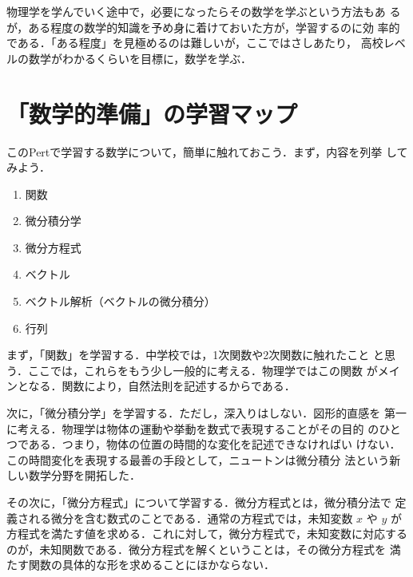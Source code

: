             物理学を学んでいく途中で，必要になったらその数学を学ぶという方法もあ
            るが，ある程度の数学的知識を予め身に着けておいた方が，学習するのに効
            率的である．「ある程度」を見極めるのは難しいが，ここではさしあたり，
            高校レベルの数学がわかるくらいを目標に，数学を学ぶ．


        \section{「数学的準備」の学習マップ}
            このPertで学習する数学について，簡単に触れておこう．まず，内容を列挙
            してみよう．
                \begin{enumerate}
                    \item 関数
                    \item 微分積分学
                    \item 微分方程式
                    \item ベクトル
                    \item ベクトル解析（ベクトルの微分積分）
                    \item 行列
                \end{enumerate}

            まず，「関数」を学習する．中学校では，1次関数や2次関数に触れたこと
            と思う．ここでは，これらをもう少し一般的に考える．物理学ではこの関数
            がメインとなる．関数により，自然法則を記述するからである．

            次に，「微分積分学」を学習する．ただし，深入りはしない．図形的直感を
            第一に考える．物理学は物体の運動や挙動を数式で表現することがその目的
            のひとつである．つまり，物体の位置の時間的な変化を記述できなければい
            けない．この時間変化を表現する最善の手段として，ニュートンは微分積分
            法という新しい数学分野を開拓した．

            その次に，「微分方程式」について学習する．微分方程式とは，微分積分法で
            定義される微分を含む数式のことである．通常の方程式では，未知変数 $x$ や $y$ が
            方程式を満たす値を求める．これに対して，微分方程式で，未知変数に対応する
            のが，未知関数である．微分方程式を解くということは，その微分方程式を
            満たす関数の具体的な形を求めることにほかならない．

